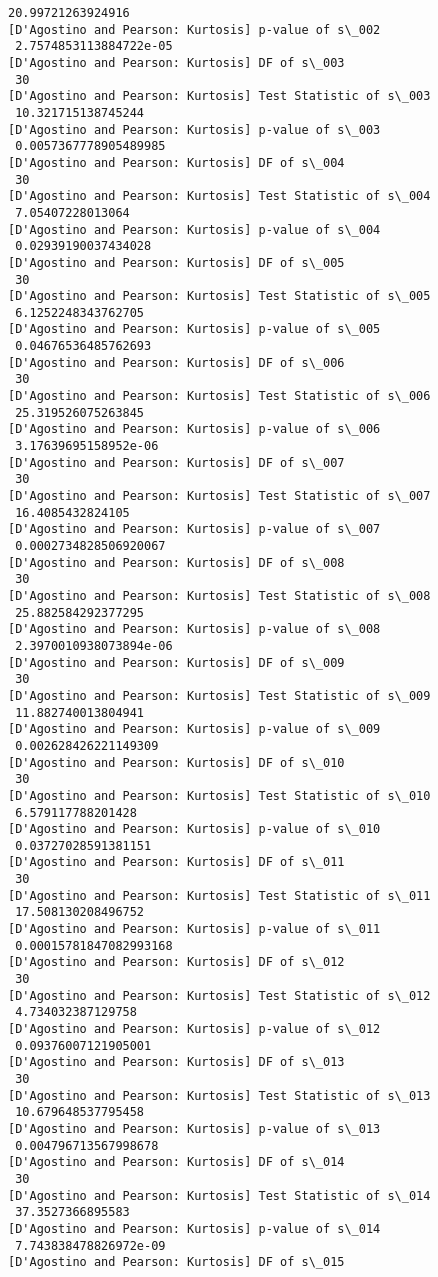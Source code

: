 \documentclass[11pt]{article}
\begin{document}
\begin{Verbatim}[commandchars=\\\{\}]
 20.99721263924916
[D'Agostino and Pearson: Kurtosis] p-value of s\_002
 2.7574853113884722e-05
[D'Agostino and Pearson: Kurtosis] DF of s\_003
 30
[D'Agostino and Pearson: Kurtosis] Test Statistic of s\_003
 10.321715138745244
[D'Agostino and Pearson: Kurtosis] p-value of s\_003
 0.0057367778905489985
[D'Agostino and Pearson: Kurtosis] DF of s\_004
 30
[D'Agostino and Pearson: Kurtosis] Test Statistic of s\_004
 7.05407228013064
[D'Agostino and Pearson: Kurtosis] p-value of s\_004
 0.02939190037434028
[D'Agostino and Pearson: Kurtosis] DF of s\_005
 30
[D'Agostino and Pearson: Kurtosis] Test Statistic of s\_005
 6.1252248343762705
[D'Agostino and Pearson: Kurtosis] p-value of s\_005
 0.04676536485762693
[D'Agostino and Pearson: Kurtosis] DF of s\_006
 30
[D'Agostino and Pearson: Kurtosis] Test Statistic of s\_006
 25.319526075263845
[D'Agostino and Pearson: Kurtosis] p-value of s\_006
 3.17639695158952e-06
[D'Agostino and Pearson: Kurtosis] DF of s\_007
 30
[D'Agostino and Pearson: Kurtosis] Test Statistic of s\_007
 16.4085432824105
[D'Agostino and Pearson: Kurtosis] p-value of s\_007
 0.0002734828506920067
[D'Agostino and Pearson: Kurtosis] DF of s\_008
 30
[D'Agostino and Pearson: Kurtosis] Test Statistic of s\_008
 25.882584292377295
[D'Agostino and Pearson: Kurtosis] p-value of s\_008
 2.3970010938073894e-06
[D'Agostino and Pearson: Kurtosis] DF of s\_009
 30
[D'Agostino and Pearson: Kurtosis] Test Statistic of s\_009
 11.882740013804941
[D'Agostino and Pearson: Kurtosis] p-value of s\_009
 0.002628426221149309
[D'Agostino and Pearson: Kurtosis] DF of s\_010
 30
[D'Agostino and Pearson: Kurtosis] Test Statistic of s\_010
 6.579117788201428
[D'Agostino and Pearson: Kurtosis] p-value of s\_010
 0.03727028591381151
[D'Agostino and Pearson: Kurtosis] DF of s\_011
 30
[D'Agostino and Pearson: Kurtosis] Test Statistic of s\_011
 17.508130208496752
[D'Agostino and Pearson: Kurtosis] p-value of s\_011
 0.00015781847082993168
[D'Agostino and Pearson: Kurtosis] DF of s\_012
 30
[D'Agostino and Pearson: Kurtosis] Test Statistic of s\_012
 4.734032387129758
[D'Agostino and Pearson: Kurtosis] p-value of s\_012
 0.09376007121905001
[D'Agostino and Pearson: Kurtosis] DF of s\_013
 30
[D'Agostino and Pearson: Kurtosis] Test Statistic of s\_013
 10.679648537795458
[D'Agostino and Pearson: Kurtosis] p-value of s\_013
 0.004796713567998678
[D'Agostino and Pearson: Kurtosis] DF of s\_014
 30
[D'Agostino and Pearson: Kurtosis] Test Statistic of s\_014
 37.3527366895583
[D'Agostino and Pearson: Kurtosis] p-value of s\_014
 7.743838478826972e-09
[D'Agostino and Pearson: Kurtosis] DF of s\_015

\end{Verbatim}
\end{document}
